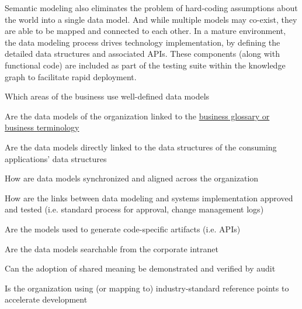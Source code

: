 Semantic modeling also eliminates the problem of hard-coding assumptions about the world into a single data model.
And while multiple models may co-exist, they are able to be mapped and connected to each other.
In a mature environment, the data modeling process drives technology implementation, by defining the detailed
data structures and associated APIs.
These components (along with functional code) are included as part of the testing suite within the knowledge graph
to facilitate rapid deployment.

\kgmmcorequestionssection

\begin{core-questions}

  \item [\thesection.1] Which areas of the business use well-defined data models
  \item [\thesection.2] Are the data models of the organization linked to the
                        \hyperref[sec:ekg-mm-business-terminology]{business glossary or business terminology}
  \item [\thesection.3] Are the data models directly linked to the data structures of the consuming applications'
                        data structures
  \item [\thesection.4] How are data models synchronized and aligned across the organization
  \item [\thesection.5] How are the links between data modeling and systems implementation approved and tested
                        (i.e. standard process for approval, change management logs)
  \item [\thesection.6] Are the models used to generate code-specific artifacts (i.e. APIs)
  \item [\thesection.7] Are the data models searchable from the corporate intranet
  \item [\thesection.8] Can the adoption of shared meaning be demonstrated and verified by audit
  \item [\thesection.9] Is the organization using (or mapping to) industry-standard reference points to
                        accelerate development

\end{core-questions}

\kgmmscoringsection

\kgmmscoringlevelOne

